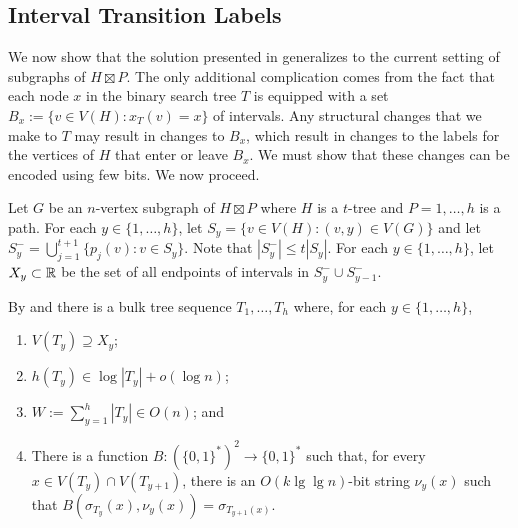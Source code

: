 \documentclass[kpfonts]{patmorin}
\let\le\leqslant
\begin{document}
\subsection{Interval Transition Labels}


We now show that the solution presented in  generalizes to the current setting of subgraphs of $H\boxtimes P$.  The only additional complication comes from the fact that each node $x$ in the binary search tree $T$ is equipped with a set $B_x:=\{v\in V(H):x_T(v)=x\}$ of intervals.  Any structural changes that we make to $T$ may result in changes to $B_x$, which result in changes to the labels for the vertices of $H$ that enter or leave $B_x$.  We must show that these changes can be encoded using few bits.  We now proceed.

Let $G$ be an $n$-vertex subgraph of $H\boxtimes P$ where $H$ is a $t$-tree and $P=1,\ldots,h$ is a path. For each $y\in\{1,\ldots,h\}$, let $S_y=\{v\in V(H): (v,y)\in V(G)\}$ and let $S^-_y=\bigcup_{j=1}^{t+1}\{p_j(v):v\in S_y\}$.  Note that $|S^-_y|\le t|S_y|$. For each $y\in\{1,\ldots,h\}$, let $X_y\subset\mathbb{R}$ be the set of all endpoints of intervals in $S^-_y\cup S^-_{y-1}$.

By  and  there is a bulk tree sequence $T_1,\ldots,T_h$ where, for each $y\in\{1,\ldots,h\}$, 
\begin{enumerate}[(PR1)]
  \item $V(T_y)\supseteq X_y$;
  \item $h(T_y)\in \log |T_y| + o(\log n)$;
  \item $W:=\sum_{y=1}^h |T_y|\in O(n)$; and
  \item There is a function $B:(\{0,1\}^*)^2\to\{0,1\}^*$ such that, for every $x\in V(T_y)\cap V(T_{y+1})$, there is an $O(k\lg\lg n)$-bit string $\nu_y(x)$ such that $B(\sigma_{T_y}(x),\nu_y(x))=\sigma_{T_{y+1}(x)}$.
\end{enumerate}
\end{document}
